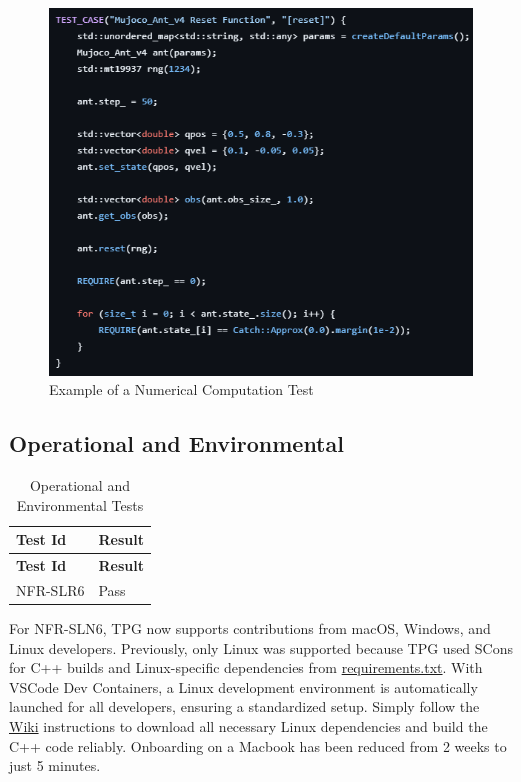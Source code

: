 \documentclass[12pt, titlepage]{article}
\begin{document}
\begin{figure}[h]
  \centering
  \includegraphics[width=1\textwidth]{img/ant_test.png}
  \caption{Example of a Numerical Computation Test}
\end{figure}

\subsection{Operational and Environmental}\label{operational}

\begin{center}
  \begin{longtable}{|p{4cm}|p{4cm}|}
  \caption{Operational and Environmental Tests} \\
  \hline
  \textbf{Test Id} & \textbf{Result} \\
  \hline
  \endfirsthead
  \hline
  \textbf{Test Id} & \textbf{Result} \\
  \hline
  \endhead
  NFR-SLR6 & Pass \\
  \hline
  \end{longtable}
\end{center}

For NFR-SLN6, TPG now supports contributions from macOS, Windows, and Linux developers.
Previously, only Linux was supported because TPG used SCons for C++ builds and Linux-specific dependencies from \href{https://gitlab.cas.mcmaster.ca/kellys32/tpg/-/blob/main/requirements.txt}{requirements.txt}.
With VSCode Dev Containers, a Linux development environment is automatically launched for all developers, ensuring a standardized setup.
Simply follow the \href{https://gitlab.cas.mcmaster.ca/kellys32/tpg/-/wikis/home}{Wiki} instructions to download all necessary Linux dependencies and build the C++ code reliably. Onboarding on a Macbook has been reduced from 2 weeks to just 5 minutes.
\end{document}
